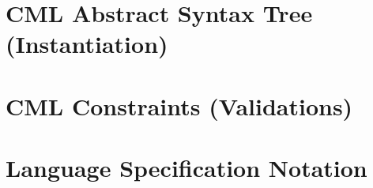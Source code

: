\documentclass[a4paper,oneside,12pt, extrafontsizes]{memoir}
\begin{document}
  \chapter{CML Abstract Syntax Tree (Instantiation)}
  \label{apx:ast}
  

  \chapter{CML Constraints (Validations)}
  \label{apx:ocl}
  

  \chapter{Language Specification Notation}
  \label{apx:lsl}
  

\backmatter



\end{document}
